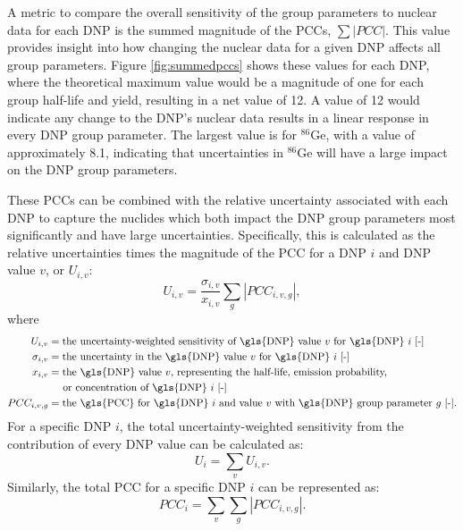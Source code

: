 A metric to compare the overall sensitivity of the group parameters to nuclear data for each \gls{DNP} is the summed magnitude of the \glspl{PCC}, $\sum \left|PCC \right|$.
This value provides insight into how changing the nuclear data for a given \gls{DNP} affects all group parameters.
Figure \ref{fig:summedpccs} shows these values for each \gls{DNP}, where the theoretical maximum value would be a magnitude of one for each group half-life and yield, resulting in a net value of 12.
A value of 12 would indicate any change to the \gls{DNP}'s nuclear data results in a linear response in every \gls{DNP} group parameter.
The largest value is for $^{86}$Ge, with a value of approximately 8.1, indicating that uncertainties in $^{86}$Ge will have a large impact on the \gls{DNP} group parameters.

These \glspl{PCC} can be combined with the relative uncertainty associated with each \gls{DNP} to capture the nuclides which both impact the \gls{DNP} group parameters most significantly and have large uncertainties.
Specifically, this is calculated as the relative uncertainties times the magnitude of the \gls{PCC} for a \gls{DNP} $i$ and \gls{DNP} value $v$, or $U_{i,v}$:
\begin{equation}
    U_{i,v} = \frac{\sigma_{i,v}}{x_{i,v}} \sum_g\left|PCC_{i,v,g}\right|,
    \label{eq:Uiv}
\end{equation}
where
\begin{align}
    U_{i,v} &= \text{the uncertainty-weighted sensitivity of \gls{DNP} value $v$ for \gls{DNP} $i$ [-]} \nonumber \\
    \sigma_{i,v} &= \text{the uncertainty in the \gls{DNP} value $v$ for \gls{DNP} $i$ [-]} \nonumber \\
    x_{i,v} &= \text{the \gls{DNP} value $v$, representing the half-life, emission probability,} \nonumber \\
    &\text{\;\;\;\;\;or concentration of \gls{DNP} $i$ [-]} \nonumber \\
    PCC_{i, v, g} &= \text{the \gls{PCC} for \gls{DNP} $i$ and value $v$ with \gls{DNP} group parameter $g$ [-].} \nonumber
\end{align}
For a specific \gls{DNP} $i$, the total uncertainty-weighted sensitivity from the contribution of every \gls{DNP} value can be calculated as:
\begin{equation}
    U_{i} = \sum_v U_{i,v}.
\end{equation}
Similarly, the total \gls{PCC} for a specific \gls{DNP} $i$ can be represented as:
\begin{equation}
    PCC_{i} = \sum_v \sum_g \left|PCC_{i,v,g}\right|.
\end{equation}


